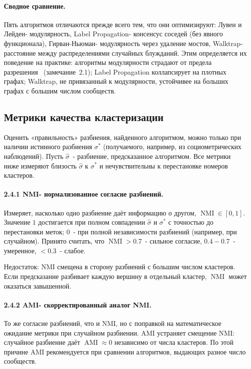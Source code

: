 \documentclass[14pt,a4paper]{extarticle}
\begin{document}
\paragraph{Сводное сравнение.} Пять алгоритмов отличаются прежде всего тем, что они оптимизируют: Лувен и Лейден- модулярность, Label Propagation- консенсус соседей (без явного функционала), Гирван-Ньюман- модулярность через удаление мостов, Walktrap- расстояние между распределениями случайных блужданий. Этим определяется их поведение на практике: алгоритмы модулярности страдают от предела разрешения~\cite{fortunato2007} (замечание~2.1); Label Propagation коллапсирует на плотных графах; Walktrap, не привязанный к модулярности, устойчивее на больших графах с большим числом сообществ.

\subsection{Метрики качества кластеризации}

Оценить «правильность» разбиения, найденного алгоритмом, можно только при наличии истинного разбиения $\sigma^*$ (получаемого, например, из социометрических наблюдений). Пусть $\hat\sigma$~- разбиение, предсказанное алгоритмом. Все метрики ниже измеряют близость $\hat\sigma$ к $\sigma^*$ и нечувствительны к перестановке номеров кластеров.

\paragraph{2.4.1 NMI- нормализованное согласие разбиений.} Измеряет, насколько одно разбиение даёт информацию о другом, $\operatorname{NMI} \in [0, 1]$. Значение $1$ достигается при полном совпадении $\hat\sigma$ и $\sigma^*$ с точностью до перестановки меток; $0$~- при полной независимости разбиений (например, при случайном). Принято считать, что $\operatorname{NMI} > 0.7$~- сильное согласие, $0.4 - 0.7$~- умеренное, $< 0.3$~- слабое.

Недостаток: NMI смещена в сторону разбиений с большим числом кластеров. Если предсказание разбивает каждую вершину в отдельный кластер, $\operatorname{NMI}$ может оказаться завышенной.

\paragraph{2.4.2 AMI- скорректированный аналог NMI.} То же согласие разбиений, что и NMI, но с поправкой на математическое ожидание метрики при случайном разбиении. AMI устраняет смещение NMI: случайное разбиение даёт $\operatorname{AMI} \approx 0$ независимо от числа кластеров. По этой причине AMI рекомендуется при сравнении алгоритмов, выдающих разное число сообществ.
\end{document}
